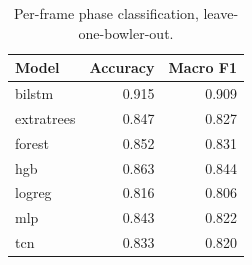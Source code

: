 \begin{table}[htbp]
  \centering
  \caption{Per-frame phase classification, leave-one-bowler-out.}
  \label{tab:models_perframe}
  \begin{tabular}{lrr}
    \toprule
    Model & Accuracy & Macro F1 \\
    \midrule
    bilstm & 0.915 & 0.909 \\
    extratrees & 0.847 & 0.827 \\
    forest & 0.852 & 0.831 \\
    hgb & 0.863 & 0.844 \\
    logreg & 0.816 & 0.806 \\
    mlp & 0.843 & 0.822 \\
    tcn & 0.833 & 0.820 \\
    \bottomrule
  \end{tabular}
\end{table}
